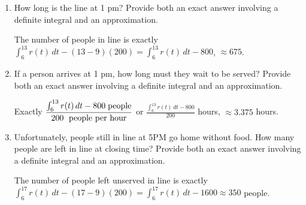 \documentclass{article}
\begin{document}
\begin{enumerate}
\begin{enumerate}
  \newpage
{}
    
\item
    \begin{problem}
      How long is the line at 1 pm? Provide both an  exact answer involving a definite integral and an approximation.
    \end{problem}
\vfill
    \begin{solution}
      The number of people in line is exactly $\displaystyle \int_6^{13} r(t)\,dt - (13-9)(200)=\displaystyle \int_6^{13} r(t)\,dt - 800$, $\approx 675$. 
    \end{solution}

  \item
    \begin{problem}
      If a person arrives at 1 pm, how long must they wait to
      be served? Provide both an  exact answer involving a definite integral and an approximation.
    \end{problem}
\vfill
    \begin{solution}
      Exactly $\displaystyle \frac{\int_6^{13} r(t)\,dt - 800 \text {\phantom{.}people}}{200 \text{\phantom{.} people per hour}}$
       or $\displaystyle \frac{\int_6^{13} r(t)\,dt - 800}{200}$ hours, $\approx 3.375$ hours.
    \end{solution}

  \item
    \begin{problem}
      Unfortunately, people still in line at 5PM go home without food. How
      many people are left in line at closing time? Provide both an  exact answer involving a definite integral and an approximation.
    \end{problem}
\vfill
    \begin{solution}
      The number of people left unserved in line is exactly $\displaystyle \int_6^{17} r(t)\,dt - (17-9)(200)=\displaystyle \int_6^{17} r(t)\,dt - 1600 \approx 350$ people. 
    \end{solution}


\end{enumerate}
\end{enumerate}
\end{document}
